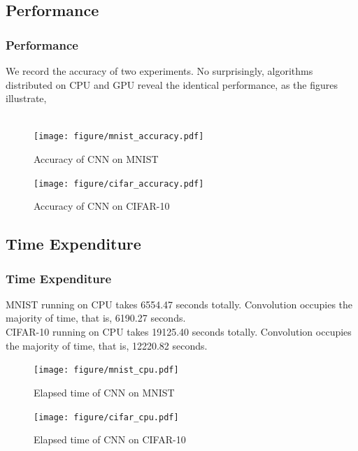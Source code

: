 \documentclass[10pt, mathserif]{beamer}	%
\newcommand{\ftitle}[1]{\frametitle{\hspace{4ex} {#1}}}	%
\begin{document}
\begin{CJK}{UTF8}{song}
\subsection{Performance}
\begin{frame}
	\ftitle{Performance}
	We record the accuracy of two experiments. No surprisingly, algorithms distributed on CPU and GPU reveal the identical performance, as the figures illustrate,\\
	~\\
	\begin{minipage}{0.45\textwidth}
		\begin{figure}
			\centering
			\texttt{[image: figure/mnist\_accuracy.pdf]}
			\caption{Accuracy of CNN on MNIST}
		\end{figure}
	\end{minipage}
	\hfill
	\begin{minipage}{0.45\textwidth}
		\begin{figure}
			\centering
			\texttt{[image: figure/cifar\_accuracy.pdf]}
			\caption{Accuracy of CNN on CIFAR-10}
		\end{figure}		
	\end{minipage}
\end{frame}

\subsection{Time Expenditure}
\begin{frame}
	\ftitle{Time Expenditure}
	MNIST running on CPU takes 6554.47 seconds totally. Convolution occupies the majority of time, that is, 6190.27 seconds. \\
	CIFAR-10 running on CPU takes 19125.40 seconds totally. Convolution occupies the majority of time, that is,  12220.82 seconds.\\
	\begin{minipage}{0.45\textwidth}
	\begin{figure}
		\centering
		\texttt{[image: figure/mnist\_cpu.pdf]}
		\caption{Elapsed time of CNN on MNIST}
	\end{figure}
	\end{minipage}
	\hfill
	\begin{minipage}{0.45\textwidth}
	\begin{figure}
		\centering
		\texttt{[image: figure/cifar\_cpu.pdf]}
		\caption{Elapsed time of CNN on CIFAR-10}
	\end{figure}		
	\end{minipage}
\end{frame}


\end{CJK}
\end{document}
